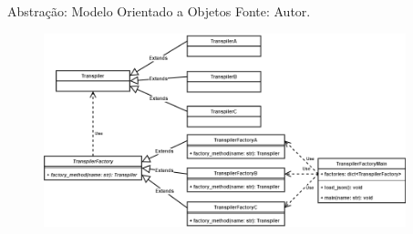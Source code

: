 \documentclass[aspectratio=169]{beamer}
\begin{document}
{\begin{frame}{Abstração: Modelo Orientado a Objetos}
  Fonte: Autor.
  \begin{figure}[H]
    \centering
    \includegraphics[width=10.5cm]{ncparser-class-transpiler-factory.png}
  \end{figure}
\end{frame}


}
\end{document}
